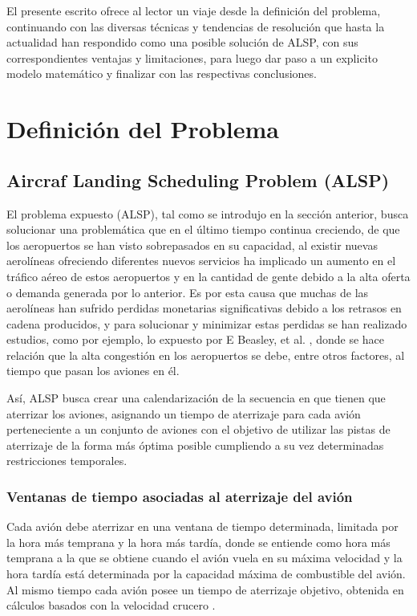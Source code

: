\documentclass[letter, 10pt]{article}
\begin{document}
El presente escrito ofrece al lector un viaje desde la definición del problema, continuando con las diversas técnicas y tendencias de resolución que hasta la actualidad han respondido como una posible solución de ALSP, con sus correspondientes ventajas y limitaciones, para luego dar paso a un explicito modelo matemático y finalizar con las respectivas conclusiones.\\


\section{Definición del Problema}
\subsection{Aircraf Landing Scheduling Problem (ALSP)}

El problema expuesto (ALSP), tal como se introdujo en la sección anterior, busca solucionar una problemática que en el último tiempo continua creciendo, de que los aeropuertos se han visto sobrepasados en su capacidad, al existir nuevas aerolíneas ofreciendo diferentes nuevos servicios ha implicado un aumento en el tráfico aéreo de estos aeropuertos y en la cantidad de gente debido a la alta oferta o demanda generada por lo anterior. 
Es por esta causa que muchas de las aerolíneas han sufrido perdidas monetarias significativas debido a los retrasos en cadena producidos, y para solucionar y minimizar estas perdidas se han realizado estudios, como por ejemplo, lo expuesto por E Beasley, et al. \cite{article2Europa}, donde se hace relación que la alta congestión en los aeropuertos se debe, entre otros factores, al tiempo que pasan los aviones en él.

Así, ALSP busca crear una calendarización de la secuencia en que tienen que aterrizar los aviones, asignando un tiempo de aterrizaje para cada avión perteneciente a un conjunto de aviones con el objetivo de utilizar las pistas de aterrizaje de la forma más óptima posible cumpliendo a su vez determinadas restricciones temporales.\\

\subsubsection{Ventanas de tiempo asociadas al aterrizaje del avión}
Cada avión debe aterrizar en una ventana de tiempo determinada, limitada por la hora más temprana y la hora más tardía, donde se entiende como hora más temprana a la que se obtiene cuando el avión vuela en su máxima velocidad y la hora tardía está determinada por la capacidad máxima de combustible del avión. Al mismo tiempo cada avión posee un tiempo de aterrizaje objetivo, obtenida en cálculos basados con la velocidad crucero \cite{RealTime}.
\end{document}
